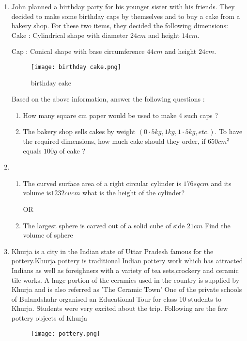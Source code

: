 \documentclass{article}
\begin{document}
\begin{enumerate}
\item John planned a birthday party for his younger sister with his friends. They decided to make some birthday caps by themselves and to buy a cake from a bakery shop. For these two items, they decided the following dimensions:
\\
Cake : Cylindrical shape with diameter $24 cm$ and height $14 cm.$

Cap : Conical shape with base circumference $44 cm$ and height $24 cm.$
\begin{figure}[H]
    \centering
    \texttt{[image: birthday cake.png]}
    \caption{birthday cake}
    \label{fig:birthday cake}
\end{figure}
Based on the above information, answer the following questions :
\begin{enumerate}
    \item How many square cm paper would be used to make 4 such caps ?
    \item The bakery shop sells cakes by weight $(0\cdot5 kg, 1 kg, 1\cdot5 kg, etc.).$ To have the required dimensions, how much cake should they order, if $650 cm^3$ equals $100 g$ of cake ?
\end{enumerate}
\newpage
\item 
\begin{enumerate}
    \item The curved surface area of a right circular cylinder is $176 sq cm$ and its volume is$1232 cu cm$ what is the height of the cylinder?
    \begin{center}
        OR
    \end{center}
    \item The largest sphere is carved out of a solid cube of side $21cm$ Find the volume of sphere
\end{enumerate}
\item Khurja is a city in the Indian state of Uttar Pradesh famous for the pottery.Khurja pottery is traditional Indian pottery work which has attracted Indians as well as foreighners with a variety of tea sets,crockery and ceramic tile works. A huge portion of the ceramics used in the country is supplied by Khurja and is also referred as 'The Ceramic Town'
One of the private schools of Bulandshahr organised an Educational Tour for class 10 students to Khurja. Students were very excited about the trip. Following are the few pottery objects of Khurja
\begin{figure}[H]
    \centering
    \texttt{[image: pottery.png]}

\end{figure}
\end{enumerate}
\end{document}
